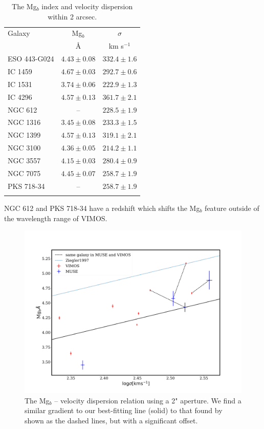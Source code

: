 			\begin{table}
			\begin{threeparttable}
				\centering
				\caption{The Mg$_b$ index and velocity dispersion within 2 arcsec.}
				\label{tab:globalMg}
				\begin{tabular}{l c c}
					\hline
					\hline
					Galaxy 	& Mg$_b$ & $\sigma$ \\
							& \AA 	& km s$^{-1}$ \\
					\hline
					ESO 443-G024 & $4.43 \pm 0.08$ & $332.4 \pm 1.6$ \\
					IC 1459 	& $4.67 \pm 0.03$ & $292.7 \pm 0.6$ \\
					IC 1531 	& $3.74 \pm 0.06$ & $222.9 \pm 1.3$ \\
					IC 4296		& $4.57 \pm 0.13$ & $361.7 \pm 2.1$ \\
					NGC 612 	& --   			  & $228.5 \pm 1.9$ \\
					NGC 1316 	& $3.45 \pm 0.08$ & $233.3 \pm 1.5$ \\
					NGC 1399 	& $4.57 \pm 0.13$ & $319.1 \pm 2.1$ \\
					NGC 3100 	& $4.36 \pm 0.05$ & $214.2 \pm 1.1$ \\
					NGC 3557 	& $4.15 \pm 0.03$ & $280.4 \pm 0.9$ \\
					NGC 7075 	& $4.45 \pm 0.07$ & $258.7 \pm 1.9$ \\
					PKS 718-34  & -- 		      & $258.7 \pm 1.9$ \\
					\hline \\
				\end{tabular}
				\begin{tablenotes}
				\footnotesize
				\item NGC 612 and PKS 718-34 have a redshift which shifts the Mg$_b$ feature outside of the wavelength range of VIMOS.
				\end{tablenotes}
			\end{threeparttable}
			\end{table}

			\begin{figure}
				\centering
				\includegraphics[width=.8\textwidth]{chapter4/Mg_sigma.png}
				\caption[Global Mg$_b$--$\sigma$]{The Mg$_b$ -- velocity dispersion relation using a 2" aperture. We find a similar gradient to our best-fitting line (solid) to that found by \citet{Ziegler1997} shown as the dashed lines, but with a significant offset.}
				\label{fig:globalMg}
			\end{figure}

